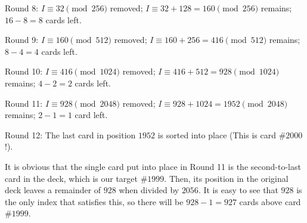 \begin{enumerate}
 Round 8: $I\equiv 32\pmod{256}$ removed; $I\equiv 32+128=160\pmod{256}$ remains; $16-8=8$ cards left.

 Round 9: $I\equiv 160\pmod{512}$ removed; $I\equiv 160+256=416\pmod{512}$ remains; $8-4=4$ cards left.

 Round 10: $I\equiv 416\pmod{1024}$ removed; $I\equiv 416+512=928\pmod{1024}$ remains; $4-2=2$ cards left.

 Round 11: $I\equiv 928\pmod{2048}$ removed; $I\equiv 928+1024=1952\pmod{2048}$ remains; $2-1=1$ card left.

 Round 12: The last card in position $1952$ is sorted into place (This is card \#$2000$!).

 It is obvious that the single card put into place in Round 11 is the second-to-last card in the deck, which is our target \#$1999$. Then, its position in the original deck leaves a remainder of $928$ when divided by $2056$. It is easy to see that $928$ is the only index that satisfies this, so there will be $928-1=\boxed{927}$ cards above card \#$1999$.

 


\end{enumerate}